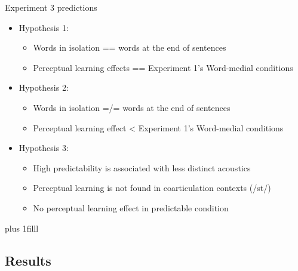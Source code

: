\documentclass{beamer}
\newcommand{\btVFill}{\vskip0pt plus 1filll}
\begin{document}
\begin{frame}{Experiment 3 predictions}

\begin{itemize}
\item Hypothesis 1:
\begin{itemize}
\item Words in isolation == words at the end of sentences
\item Perceptual learning effects == Experiment 1's Word-medial conditions
\end{itemize}
\item Hypothesis 2:
\begin{itemize}
\item Words in isolation =/= words at the end of sentences
\item Perceptual learning effect < Experiment 1's Word-medial conditions
\end{itemize}
\item Hypothesis 3:
\begin{itemize}
\item High predictability is associated with less distinct acoustics
\item Perceptual learning is not found in coarticulation contexts (/st\textturnr/)
\item No perceptual learning effect in predictable condition
\end{itemize}
\end{itemize}
\btVFill
\begin{flushright}
\scriptsize
\citet{Clopper2008, Scarborough2010,Kraljic2008a}
\end{flushright}
\end{frame}

\subsection{Results}
\end{document}

